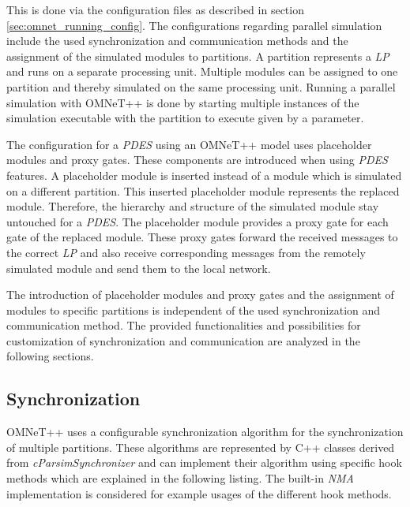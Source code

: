 This is done via the configuration files as described in section \ref{sec:omnet_running_config}.
The configurations regarding parallel simulation include the used synchronization and communication methods and the assignment of the simulated modules to partitions.
A partition represents a \emph{LP} and runs on a separate processing unit.
Multiple modules can be assigned to one partition and thereby simulated on the same processing unit. 
Running a parallel simulation with OMNeT++ is done by starting multiple instances of the simulation executable with the partition to execute given by a parameter.

The configuration for a \emph{PDES} using an OMNeT++ model uses placeholder modules and proxy gates.
These components are introduced when using \emph{PDES} features.
A placeholder module is inserted instead of a module which is simulated on a different partition.
This inserted placeholder module represents the replaced module.
Therefore, the hierarchy and structure of the simulated module stay untouched for a \emph{PDES}.
The placeholder module provides a proxy gate for each gate of the replaced module.
These proxy gates forward the received messages to the correct \emph{LP} and also receive corresponding messages from the remotely simulated module and send them to the local network.
\cite[section III]{varga_parallel_2003} \cite[chapter 16]{omnet_manual}

The introduction of placeholder modules and proxy gates and the assignment of modules to specific partitions is independent of the used synchronization and communication method.
The provided functionalities and possibilities for customization of synchronization and communication are analyzed in the following sections.

\subsection{Synchronization}
\label{sec:parallel_omnet_sync}
OMNeT++ uses a configurable synchronization algorithm for the synchronization of multiple partitions.
These algorithms are represented by C++ classes derived from \emph{cParsimSynchronizer} and can implement their algorithm using specific hook methods which are explained in the following listing.
The built-in \emph{NMA} implementation is considered for example usages of the different hook methods.

